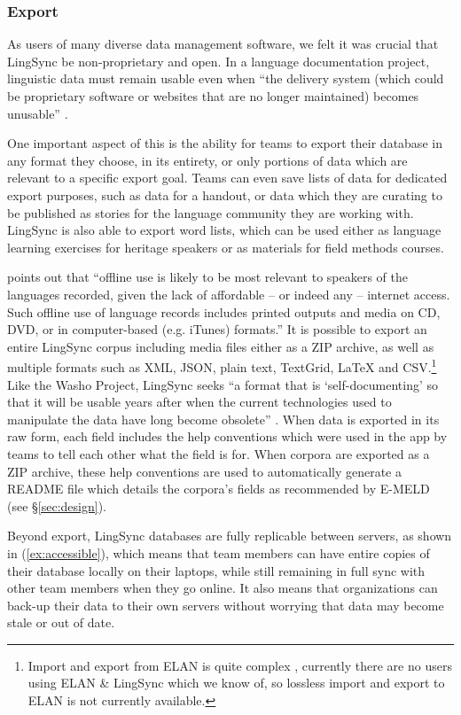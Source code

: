 \documentclass[letterpaper, 12pt, dvips]{mitwpl}
\begin{document}
\subsubsection{Export}

As users of many diverse data management software,
we felt it was crucial that LingSync be non-proprietary and open. In a language documentation project,  linguistic data must remain usable even when ``the delivery system (which could be proprietary software or websites that are no longer maintained) becomes unusable'' \citep[p.132]{Thieberger:2012}.

One important aspect of this is the ability for teams to export their database in any format they choose,
in its entirety, or only portions of data which are relevant to a specific export goal.
Teams can even save lists of data for dedicated export purposes,
such as data for a handout,
or data which they are curating to be published as stories for the language community they are working with.
LingSync is also able to export word lists,
which can be used either as language learning exercises for heritage speakers or as materials for field methods courses.

\cite{Thieberger:2012} points out that ``offline use is likely to be most relevant to speakers of the languages recorded, given the lack of affordable -- or indeed any -- internet access. Such offline use of language records includes printed outputs and media on CD, DVD, or in computer-based (e.g. iTunes) formats.'' 
It is possible to export an entire LingSync corpus including media files either as a ZIP archive,
as well as multiple formats such as XML, JSON, plain text, TextGrid, LaTeX  and CSV.\footnote{Import and export from ELAN is quite complex \citep{Schroeter:2006}, currently there are no users using ELAN \& LingSync which we know of, so lossless import and export to ELAN is not currently available.} Like the Washo Project, LingSync seeks ``a format that is `self-documenting' so that it will be usable years after when the current technologies used to manipulate the data have long become obsolete'' \citep[p.4]{Cihlar:2008}. When data is exported in its raw form, each field includes the help conventions which were used in the app by teams to tell each other what the field is for. When corpora are exported as a ZIP archive, these help conventions are used to automatically generate a README file which details the corpora's fields as recommended by E-MELD (see \S \ref{sec:design}).

Beyond export,
LingSync databases are fully replicable between servers, as shown in (\ref{ex:accessible}),
which means that team members can have entire copies of their database locally on their laptops,
while still remaining in full sync with other team members when they go online.
It also means that organizations can back-up their data to their own servers without worrying that data may become stale or out of date.
\end{document}
